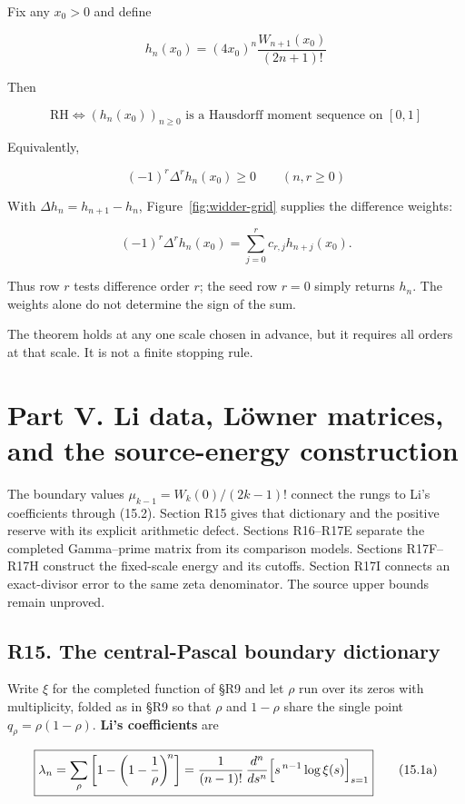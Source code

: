 \documentclass[
  11pt,
]{book}
\newcommand{\figref}[1]{Figure~\ref{#1}}
\begin{document}
Fix any \(x_0>0\) and define

\[
h_n(x_0)=(4x_0)^n\frac{W_{n+1}(x_0)}{(2n+1)!}
\tag{14.1}
\]

Then

\[
\boxed{
\mathrm{RH}\iff(h_n(x_0))_{n\ge0}
\text{ is a Hausdorff moment sequence on }[0,1]}
\tag{14.2}
\]

Equivalently,

\[
(-1)^r\Delta^rh_n(x_0)\ge0
\qquad(n,r\ge0)
\tag{14.3}
\]

With \(\Delta h_n=h_{n+1}-h_n\), \figref{fig:widder-grid} supplies the
difference weights:

\[
(-1)^r\Delta^rh_n(x_0)=\sum_{j=0}^r c_{r,j}h_{n+j}(x_0).
\tag{14.3a}
\]

Thus row \(r\) tests difference order \(r\); the seed row \(r=0\) simply
returns \(h_n\). The weights alone do not determine the sign of the sum.

The theorem holds at any one scale chosen in advance, but it requires
all orders at that scale. It is not a finite stopping rule.

\chapter{Part V. Li data, Löwner matrices, and the source-energy
construction}\label{part-v.-li-data-luxf6wner-matrices-and-the-source-energy-construction}

The boundary values \(\mu_{k-1}=W_k(0)/(2k-1)!\) connect the rungs to
Li's coefficients through (15.2). Section R15 gives that dictionary and
the positive reserve with its explicit arithmetic defect. Sections
R16--R17E separate the completed Gamma--prime matrix from its comparison
models. Sections R17F--R17H construct the fixed-scale energy and its
cutoffs. Section R17I connects an exact-divisor error to the same zeta
denominator. The source upper bounds remain unproved.

\section{R15. The central-Pascal boundary
dictionary}\label{r15.-the-central-pascal-boundary-dictionary}

Write \(\xi\) for the completed function of §R9 and let \(\rho\) run
over its zeros with multiplicity, folded as in §R9 so that \(\rho\) and
\(1-\rho\) share the single point \(q_\rho=\rho(1-\rho)\). \textbf{Li's
coefficients} are

\[
\boxed{\lambda_n=\sum_\rho\left[1-\left(1-\frac1\rho\right)^{\!n}\right]
=\frac1{(n-1)!}\,\frac{d^n}{ds^n}
\Bigl[s^{\,n-1}\log\xi(s)\Bigr]_{s=1}}
\tag{15.1a}
\]
\end{document}
